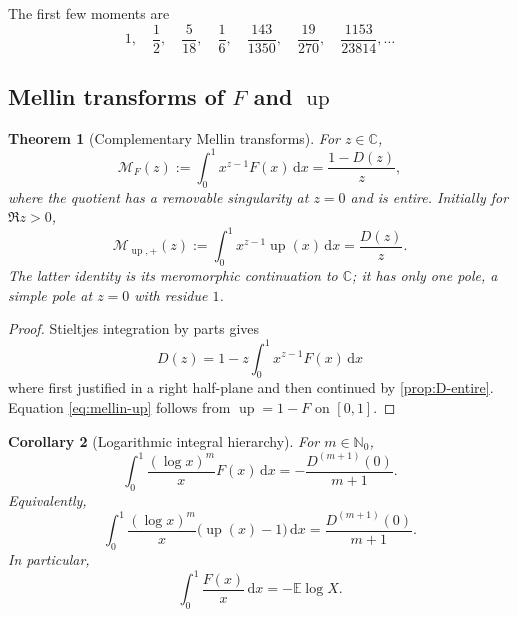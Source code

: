 \documentclass[11pt,oneside]{article}
\newtheorem{theorem}{Theorem}[section]
\newtheorem{corollary}[theorem]{Corollary}
\theoremstyle{definition}
\theoremstyle{remark}
\newcommand{\C}{\mathbb C}
\newcommand{\N}{\mathbb N}
\newcommand{\E}{\mathbb E}
\newcommand{\dd}{\,\mathrm d}
\newcommand{\upf}{\operatorname{up}}
\begin{document}
The first few moments are
\begin{equation}\label{eq:first-moments}
 1,\quad \frac12,\quad \frac5{18},\quad \frac16,
 \quad \frac{143}{1350},\quad \frac{19}{270},
 \quad \frac{1153}{23814},\ldots
\end{equation}

\subsection{Mellin transforms of $F$ and $\upf$}

\begin{theorem}[Complementary Mellin transforms]\label{thm:mellin-pair}
For $z\in\C$,
\begin{equation}\label{eq:mellin-F}
 \mathcal M_F(z):=\int_0^1x^{z-1}F(x)\dd x
 =\frac{1-D(z)}{z},
\end{equation}
where the quotient has a removable singularity at $z=0$ and is entire.  Initially for $\Re z>0$,
\begin{equation}\label{eq:mellin-up}
 \mathcal M_{\upf,+}(z):=\int_0^1x^{z-1}\upf(x)\dd x
 =\frac{D(z)}{z}.
\end{equation}
The latter identity is its meromorphic continuation to $\C$; it has only one pole, a simple pole at $z=0$ with residue $1$.
\end{theorem}

\begin{proof}
Stieltjes integration by parts gives
\[
 D(z)=1-z\int_0^1x^{z-1}F(x)\dd x
\]
where first justified in a right half-plane and then continued by \cref{prop:D-entire}.  Equation \eqref{eq:mellin-up} follows from $\upf=1-F$ on $[0,1]$.
\end{proof}

\begin{corollary}[Logarithmic integral hierarchy]\label{cor:logarithmic-hierarchy}
For $m\in\N_0$,
\begin{equation}\label{eq:logarithmic-F}
 \int_0^1\frac{(\log x)^m}{x}F(x)\dd x
 =-\frac{D^{(m+1)}(0)}{m+1}.
\end{equation}
Equivalently,
\begin{equation}\label{eq:logarithmic-up-regularized}
 \int_0^1\frac{(\log x)^m}{x}\bigl(\upf(x)-1\bigr)\dd x
 =\frac{D^{(m+1)}(0)}{m+1}.
\end{equation}
In particular,
\begin{equation}\label{eq:ElogX}
 \int_0^1\frac{F(x)}x\dd x=-\E\log X.
\end{equation}
\end{corollary}
\end{document}
